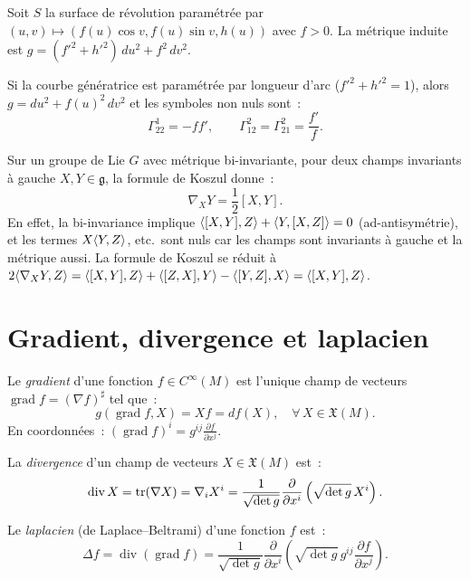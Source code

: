 \begin{exemple}
Soit $S$ la surface de r\'evolution param\'etr\'ee par
$(u, v) \mapsto (f(u)\cos v, f(u)\sin v, h(u))$ avec $f > 0$.
La m\'etrique induite est $g = (f'^2 + h'^2)\, du^2 + f^2\, dv^2$.

Si la courbe g\'en\'eratrice est param\'etr\'ee par longueur d'arc ($f'^2 + h'^2 = 1$),
alors $g = du^2 + f(u)^2\, dv^2$ et les symboles non nuls sont~:
\[
    \Gamma^1_{22} = -f f', \qquad
    \Gamma^2_{12} = \Gamma^2_{21} = \frac{f'}{f}.
\]
\end{exemple}

\begin{exemple}
\label{ex:bi_inv_christoffel}
Sur un groupe de Lie $G$ avec m\'etrique bi-invariante, pour deux champs invariants
\`a gauche $X, Y \in \mathfrak{g}$, la formule de Koszul donne~:
\[
    \nabla_X Y = \frac{1}{2}[X, Y].
\]
En effet, la bi-invariance implique $\langle [X,Y], Z \rangle + \langle Y, [X,Z] \rangle = 0$
(ad-antisym\'etrie), et les termes $X\langle Y, Z \rangle$, etc.\ sont nuls car les champs
sont invariants \`a gauche et la m\'etrique aussi. La formule de Koszul se r\'eduit \`a
$2\langle \nabla_X Y, Z \rangle = \langle [X,Y], Z \rangle + \langle [Z,X], Y \rangle - \langle [Y,Z], X \rangle
= \langle [X,Y], Z \rangle$.
\end{exemple}

\section{Gradient, divergence et laplacien}

\begin{definition}[Gradient]
Le \emph{gradient} d'une fonction $f \in C^\infty(M)$ est l'unique champ de
vecteurs $\operatorname{grad} f = (\nabla f)^\sharp$ tel que~:
\[
    g(\operatorname{grad} f, X) = Xf = df(X), \quad \forall\, X \in \mathfrak{X}(M).
\]
En coordonn\'ees~: $(\operatorname{grad} f)^i = g^{ij} \frac{\partial f}{\partial x^j}$.
\end{definition}

\begin{definition}[Divergence]
La \emph{divergence} d'un champ de vecteurs $X \in \mathfrak{X}(M)$ est~:
\[
    \operatorname{div} X = \mathrm{tr}(\nabla X) = \nabla_i X^i
    = \frac{1}{\sqrt{\det g}} \frac{\partial}{\partial x^i}
    \left(\sqrt{\det g}\, X^i\right).
\]
\end{definition}

\begin{definition}
Le \emph{laplacien} (de Laplace--Beltrami) d'une fonction $f$ est~:
\[
    \Delta f = \operatorname{div}(\operatorname{grad} f)
    = \frac{1}{\sqrt{\det g}} \frac{\partial}{\partial x^i}
    \left(\sqrt{\det g}\, g^{ij} \frac{\partial f}{\partial x^j}\right).
\]
\end{definition}

